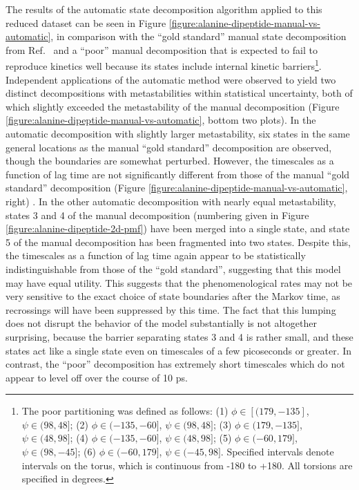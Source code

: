 The results of the automatic state decomposition algorithm applied to this reduced dataset can be seen in Figure \ref{figure:alanine-dipeptide-manual-vs-automatic}, in comparison with the ``gold standard'' manual state decomposition from Ref.\ \cite{chodera:mms:2006} and a ``poor'' manual decomposition that is expected to fail to reproduce kinetics well because its states include internal kinetic barriers\footnote{The poor partitioning was defined as follows: (1) $\phi \in [(179,-135]$, $\psi \in (98,48]$; (2) $\phi \in (-135,-60]$, $\psi \in (98,48]$; (3) $\phi \in (179,-135]$, $\psi \in (48,98]$; (4) $\phi \in (-135,-60]$, $\psi \in (48,98]$; (5) $\phi \in (-60,179]$, $\psi \in (98,-45]$; (6) $\phi \in (-60,179]$, $\psi \in (-45,98]$.  Specified intervals denote intervals on the torus, which is continuous from -180 to +180.  All torsions are specified in degrees.}.
Independent applications of the automatic method were observed to yield two distinct decompositions with metastabilities within statistical uncertainty, both of which slightly exceeded the metastability of the manual decomposition (Figure \ref{figure:alanine-dipeptide-manual-vs-automatic}, bottom two plots).
In the automatic decomposition with slightly larger metastability, six states in the same general locations as the manual ``gold standard'' decomposition are observed, though the boundaries are somewhat perturbed.
However, the timescales as a function of lag time are not significantly different from those of the manual ``gold standard'' decomposition  (Figure \ref{figure:alanine-dipeptide-manual-vs-automatic}, right) .
In the other automatic decomposition with nearly equal metastability, states 3 and 4 of the manual decomposition (numbering given in Figure \ref{figure:alanine-dipeptide-2d-pmf}) have been merged into a single state, and state 5 of the manual decomposition has been fragmented into two states.
Despite this, the timescales as a function of lag time again appear to be statistically indistinguishable from those of the ``gold standard'', suggesting that this model may have equal utility.
This suggests that the phenomenological rates may not be very sensitive to the exact choice of state boundaries after the Markov time, as recrossings will have been suppressed by this time.
The fact that this lumping does not disrupt the behavior of the model substantially is not altogether surprising, because the barrier separating states 3 and 4 is rather small, and these states act like a single state even on timescales of a few picoseconds or greater.
In contrast, the ``poor'' decomposition has extremely short timescales which do not appear to level off over the course of 10 ps.

